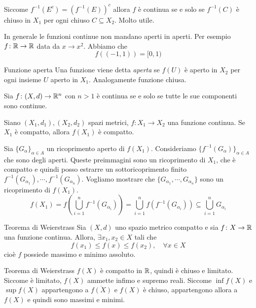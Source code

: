 \documentclass[a4paper]{article}
\begin{document}
Siccome \(f^{-1}(E^c) = \left(f^{-1}(E)\right)^c\) allora \(f\)
è continua se e solo se \(f^{-1}(C)\) è chiuso in \(X_1\)
per ogni chiuso \(C \subseteq X_2\). Molto utile.

In generale le funzioni continue non mandano aperti in aperti.
Per esempio \(f \colon \mathbb{R} \to \mathbb{R}\)
data da \(x \to x^2\).
Abbiamo che
\[
    f((-1,1)) = [0,1)
\]

\begin{snippetdefinition}{Funzione aperta}
    Una funzione viene detta \emph{aperta}
    se \(f(U)\) è aperto in \(X_2\) per ogni insieme \(U\) aperto in \(X_1\).
    Analogamente funzione chiusa.
\end{snippetdefinition}

Sia \(f \colon (X, d) \to \mathbb{R}^n\) con \(n>1\)
è continua se e solo se tutte le sue componenti sono continue.

\begin{snippetproposition}{}
    Siano \((X_1, d_1), (X_2, d_2)\)
    spazi metrici, \(f \colon X_1 \to X_2\) una funzione continua.
    Se \(X_1\) è compatto, allora \(f(X_1)\) è compatto.
\end{snippetproposition}

\begin{snippetproof}{}
    Sia \(\{G_\alpha\}_{\alpha \in A}\) un ricoprimento aperto di \(f(X_1)\).
    Consideriamo \(\{f^{-1}(G_\alpha)\}_{\alpha \in A}\) che sono degli aperti.
    Queste preimmagini sono un ricoprimento di \(X_1\),
    che è compatto e quindi posso estrarre un sottoricoprimento finito
    \(f^{-1}(G_{\alpha_1}), \cdots, f^{-1}(G_{\alpha_n})\).
    Vogliamo mostrare che \(\{G_{\alpha_1}, \cdots, G_{\alpha_n}\}\)
    sono un ricoprimento di \(f(X_1)\).
    \[
        f(X_1) = f \left(
            \bigcup_{i=1}^n f^{-1}( G_{\alpha_i})
        \right)
        = \bigcup_{i=1}^n f\left(
            f^{-1}(G_{\alpha_i})
        \right)
        \subseteq \bigcup_{i=1}^n G_{\alpha_i}
    \]
\end{snippetproof}

\begin{snippettheorem}{Teorema di Weierstrass}
    Sia \((X,d)\) uno spazio metrico compatto e sia
    \(f \colon X \to \mathbb{R}\) una funzione continua.
    Allora, \(\exists x_1, x_2 \in X\) tali che
    \[
        f(x_1) \leq f(x) \leq f(x_2), \quad \forall x \in X
    \]
    cioè \(f\) possiede massimo e minimo assoluto.
\end{snippettheorem}

\begin{snippetproof}{Teorema di Weierstrass}
    \(f(X)\) è compatto in \(\mathbb{R}\), quindi è chiuso e limitato.
    Siccome è limitato, \(f(X)\) ammette infimo e supremo reali.
    Siccome \(\inf f(X)\) e \(\sup f(X)\)
    appartengono a \(\overline{f(X)}\) e \(f(X)\) è chiuso, appartengono allora a \(f(X)\)
    e quindi sono massimi e minimi.
\end{snippetproof}
\end{document}
